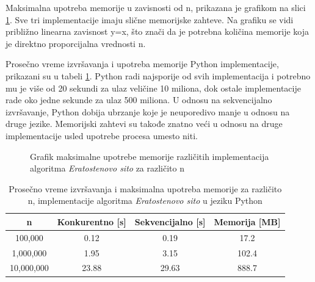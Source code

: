 \documentclass[12pt,oneside]{memoir}
\begin{document}
Maksimalna upotreba memorije u zavisnosti od n, prikazana je grafikom na slici \ref{fig:prime2}. Sve tri implementacije imaju slične memorijske zahteve. Na grafiku se vidi približno linearna zavisnost y=x, što znači da je potrebna količina memorije koja je direktno proporcijalna vrednosti n.

Prosečno vreme izvršavanja i upotreba memorije Python implementacije, prikazani su u tabeli \ref{tab:prime1}. Python radi najsporije od svih implementacija i potrebno mu je više od 20 sekundi za ulaz veličine 10 miliona, dok ostale implementacije rade oko jedne sekunde za ulaz 500 miliona. U odnosu na sekvencijalno izvršavanje, Python dobija ubrzanje koje je neuporedivo manje u odnosu na druge jezike. Memorijski zahtevi su takođe znatno veći u odnosu na druge implementacije usled upotrebe procesa umesto niti.

\begin{figure}[H]
\begin{center}


\caption{Grafik maksimalne upotrebe memorije različitih implementacija algoritma \textit{Eratostenovo sito} za različito n}
\label{fig:prime2}
\end{center}
\end{figure}

\begin{table}[H]
\begin{center}
\caption{Prosečno vreme izvršavanja i maksimalna upotreba memorije za različito n, implementacije algoritma \textit{Eratostenovo sito} u jeziku Python}
\begin{tabular}{||c||c|c|c||}
\hline
n & Konkurentno [s]& Sekvencijalno [s] & Memorija [MB] \\ \hline
100,000	&0.12	&0.19&17.2\\
1,000,000	&1.95	&3.15&102.4\\
10,000,000	&23.88&29.63&888.7\\
\hline
\end{tabular}
\label{tab:prime1}
\end{center}
\end{table}
\end{document}

